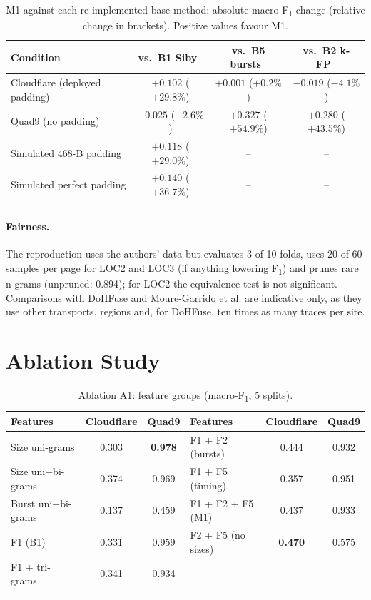 \documentclass[pdflatex,sn-mathphys-num]{sn-jnl}
\newcommand{\Fone}{F\textsubscript{1}}
\begin{document}
\begin{table}[t]
\caption{M1 against each re-implemented base method: absolute macro-\Fone{} change (relative change in brackets). Positive values favour M1.}\label{tab:improve}
\scriptsize\setlength{\tabcolsep}{3pt}
\begin{tabular*}{\textwidth}{@{\extracolsep\fill}lccc@{}}
\toprule
Condition & vs.\ B1 Siby~\cite{siby2020} & vs.\ B5 bursts~\cite{mouregarrido2026} & vs.\ B2 k-FP~\cite{hayes2016kfp} \\
\midrule
Cloudflare (deployed padding) & $+0.102$ ($+29.8\%$) & $+0.001$ ($+0.2\%$) & $-0.019$ ($-4.1\%$) \\
Quad9 (no padding) & $-0.025$ ($-2.6\%$) & $+0.327$ ($+54.9\%$) & $+0.280$ ($+43.5\%$) \\
Simulated 468-B padding & $+0.118$ ($+29.0\%$) & -- & -- \\
Simulated perfect padding & $+0.140$ ($+36.7\%$) & -- & -- \\
\botrule
\end{tabular*}
\end{table}

\paragraph{Fairness.} The reproduction uses the authors' data but evaluates 3 of 10 folds, uses 20 of 60 samples per page for LOC2 and LOC3 (if anything lowering \Fone{}) and prunes rare n-grams (unpruned: 0.894); for LOC2 the equivalence test is not significant. Comparisons with DoHFuse and Moure-Garrido et al. are indicative only, as they use other transports, regions and, for DoHFuse, ten times as many traces per site.

\section{Ablation Study}\label{sec:ablation}

\begin{table}[t]
\caption{Ablation A1: feature groups (macro-\Fone{}, 5 splits).}\label{tab:a1}
\scriptsize\setlength{\tabcolsep}{2pt}
\begin{tabular*}{\textwidth}{@{\extracolsep\fill}lcc|lcc@{}}
\toprule
Features & Cloudflare & Quad9 & Features & Cloudflare & Quad9 \\
\midrule
Size uni-grams & 0.303 & \textbf{0.978} & F1 + F2 (bursts) & 0.444 & 0.932 \\
Size uni+bi-grams & 0.374 & 0.969 & F1 + F5 (timing) & 0.357 & 0.951 \\
Burst uni+bi-grams & 0.137 & 0.459 & F1 + F2 + F5 (M1) & 0.437 & 0.933 \\
F1 (B1) & 0.331 & 0.959 & F2 + F5 (no sizes) & \textbf{0.470} & 0.575 \\
F1 + tri-grams & 0.341 & 0.934 & & & \\
\botrule
\end{tabular*}
\end{table}
\end{document}
